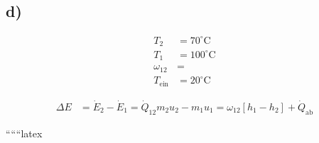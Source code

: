 

\subsection*{d)}
\begin{align*}
T_2 &= 70^\circ\text{C} \\
T_1 &= 100^\circ\text{C} \\
\omega_{12} &= \\
T_{\text{ein}} &= 20^\circ\text{C}
\end{align*}

\begin{align*}
\Delta E &= \dot{E}_2 - \dot{E}_1 = \dot{Q}_{12} m_2 u_2 - m_1 u_1 = \omega_{12} \left[ h_1 - h_2 \right] + \dot{Q}_{\text{ab}}
\end{align*}

``````latex